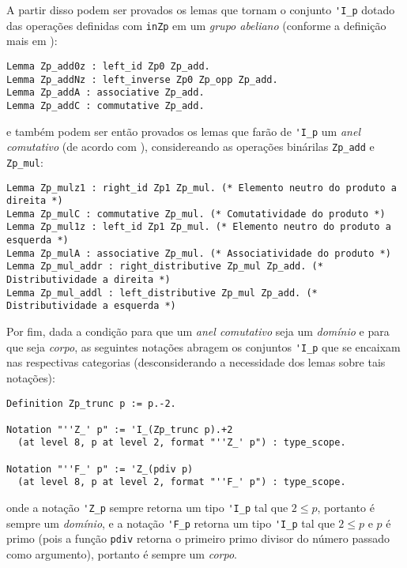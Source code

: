 A partir disso podem ser provados os lemas que tornam o conjunto \lstinline[language = coq]{'I_p} dotado das operações definidas com \lstinline[language = coq]{inZp} em um \textit{grupo abeliano} (conforme a definição mais em \cite{book:2399854}):
    \begin{lstlisting}[language=coq,frame=single,tabsize=1]
Lemma Zp_add0z : left_id Zp0 Zp_add.
Lemma Zp_addNz : left_inverse Zp0 Zp_opp Zp_add.
Lemma Zp_addA : associative Zp_add.
Lemma Zp_addC : commutative Zp_add.
    \end{lstlisting}
e também podem ser então provados os lemas que farão de \lstinline[language = coq]{'I_p} um \textit{anel comutativo} (de acordo com \cite{book:2399854}), considereando as operações binárilas \lstinline[language = coq]{Zp_add} e \lstinline[language = coq]{Zp_mul}:
    \begin{lstlisting}[language=coq,frame=single,tabsize=1]
Lemma Zp_mulz1 : right_id Zp1 Zp_mul. (* Elemento neutro do produto a direita *)
Lemma Zp_mulC : commutative Zp_mul. (* Comutatividade do produto *)
Lemma Zp_mul1z : left_id Zp1 Zp_mul. (* Elemento neutro do produto a esquerda *)
Lemma Zp_mulA : associative Zp_mul. (* Associatividade do produto *)
Lemma Zp_mul_addr : right_distributive Zp_mul Zp_add. (* Distributividade a direita *)
Lemma Zp_mul_addl : left_distributive Zp_mul Zp_add. (* Distributividade a esquerda *)
    \end{lstlisting}
Por fim, dada a condição para que um \textit{anel comutativo} seja um \textit{domínio} e para que seja \textit{corpo}, as seguintes notações abragem os conjuntos \lstinline[language=coq]|'I_p| que se encaixam nas respectivas categorias (desconsiderando a necessidade dos lemas sobre tais notações):
    \begin{lstlisting}[language=coq,frame=single,tabsize=1]
Definition Zp_trunc p := p.-2.

Notation "''Z_' p" := 'I_(Zp_trunc p).+2
  (at level 8, p at level 2, format "''Z_' p") : type_scope.
  
Notation "''F_' p" := 'Z_(pdiv p)
  (at level 8, p at level 2, format "''F_' p") : type_scope.
    \end{lstlisting}
onde a notação \lstinline[language=coq]|'Z_p| sempre retorna um tipo \lstinline[language=coq]|'I_p| tal que $2 \leq p$, portanto é sempre um \textit{domínio}, e a notação \lstinline[language=coq]|'F_p| retorna um tipo \lstinline[language=coq]|'I_p| tal que $2 \leq p$ e $p$ é primo (pois a função \lstinline[language=coq]|pdiv| retorna o primeiro primo divisor do número passado como argumento), portanto é sempre um \textit{corpo}.

